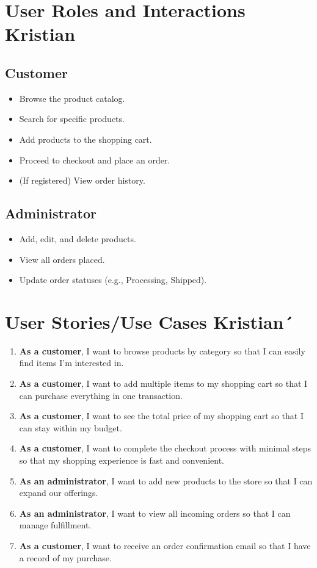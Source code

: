 \documentclass[a4paper,12pt]{article}
\begin{document}
	\section{User Roles and Interactions Kristian}
	\subsection{Customer}
	\begin{itemize}
		\item Browse the product catalog.
		\item Search for specific products.
		\item Add products to the shopping cart.
		\item Proceed to checkout and place an order.
		\item (If registered) View order history.
	\end{itemize}
	
	\subsection{Administrator}
	\begin{itemize}
		\item Add, edit, and delete products.
		\item View all orders placed.
		\item Update order statuses (e.g., Processing, Shipped).
	\end{itemize}
	
	\section{User Stories/Use Cases Kristian´}
	\begin{enumerate}
		\item \textbf{As a customer}, I want to browse products by category so that I can easily find items I'm interested in.
		\item \textbf{As a customer}, I want to add multiple items to my shopping cart so that I can purchase everything in one transaction.
		\item \textbf{As a customer}, I want to see the total price of my shopping cart so that I can stay within my budget.
		\item \textbf{As a customer}, I want to complete the checkout process with minimal steps so that my shopping experience is fast and convenient.
		\item \textbf{As an administrator}, I want to add new products to the store so that I can expand our offerings.
		\item \textbf{As an administrator}, I want to view all incoming orders so that I can manage fulfillment.
		\item \textbf{As a customer}, I want to receive an order confirmation email so that I have a record of my purchase.
	\end{enumerate}
	
\end{document}

